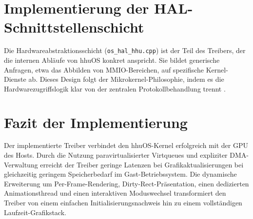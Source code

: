 \section{Implementierung der HAL-Schnittstellenschicht}
Die Hardwareabstraktionsschicht (\texttt{os\_hal\_hhu.cpp}) ist der Teil des
Treibers, der die internen Abläufe von hhuOS konkret anspricht. Sie bildet
generische Anfragen, etwa das Abbilden von MMIO-Bereichen, auf spezifische
Kernel-Dienste ab. Dieses Design folgt der Mikrokernel-Philosophie, indem es
die Hardwarezugriffslogik klar von der zentralen Protokollbehandlung trennt
\cite{Liedtke1995}.

\section{Fazit der Implementierung}
Der implementierte Treiber verbindet den hhuOS-Kernel erfolgreich mit der GPU
des Hosts. Durch die Nutzung paravirtualisierter Virtqueues und expliziter
DMA-Verwaltung erreicht der Treiber geringe Latenzen bei
Grafikaktualisierungen bei gleichzeitig geringem Speicherbedarf im
Gast-Betriebssystem. Die dynamische Erweiterung um Per-Frame-Rendering,
Dirty-Rect-Präsentation, einen dedizierten Animationsthread und einen
interaktiven Moduswechsel transformiert den Treiber von einem einfachen
Initialisierungsnachweis hin zu einem vollständigen Laufzeit-Grafikstack.

\newpage
